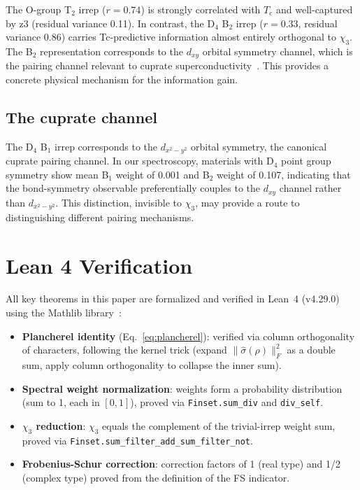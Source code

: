 \documentclass[aps,prb,twocolumn,superscriptaddress]{revtex4-2}
\newcommand{\Tc}{T_{\mathrm{c}}}
\newcommand{\frobsq}[1]{\lVert #1 \rVert_F^2}
\newcommand{\sighat}{\hat{\sigma}}
\begin{document}
The O-group T$_2$ irrep ($r = 0.74$) is strongly correlated with
$\Tc$ and well-captured by z3 (residual variance 0.11). In contrast,
the D$_4$ B$_2$ irrep ($r = 0.33$, residual variance 0.86) carries
Tc-predictive information almost entirely orthogonal to $\chi_3$. The
B$_2$ representation corresponds to the $d_{xy}$ orbital symmetry
channel, which is the pairing channel relevant to cuprate
superconductivity~\cite{sigrist1991su}. This provides a concrete
physical mechanism for the information gain.

\subsection{The cuprate channel}

The D$_4$ B$_1$ irrep corresponds to the $d_{x^2 - y^2}$ orbital
symmetry, the canonical cuprate pairing channel. In our spectroscopy,
materials with D$_4$ point group symmetry show mean B$_1$ weight of
0.001 and B$_2$ weight of 0.107, indicating that the bond-symmetry
observable preferentially couples to the $d_{xy}$ channel rather than
$d_{x^2-y^2}$. This distinction, invisible to $\chi_3$, may provide
a route to distinguishing different pairing mechanisms.

\section{Lean 4 Verification}
\label{sec:lean}

All key theorems in this paper are formalized and verified in Lean~4
(v4.29.0) using the Mathlib library~\cite{mathlib}:

\begin{itemize}
  \item \textbf{Plancherel identity} (Eq.~\ref{eq:plancherel}):
    verified via column orthogonality of characters, following the
    kernel trick (expand $\frobsq{\sighat(\rho)}$ as a double sum,
    apply column orthogonality to collapse the inner sum).
  \item \textbf{Spectral weight normalization}: weights form a
    probability distribution (sum to 1, each in $[0,1]$), proved
    via \texttt{Finset.sum\_div} and \texttt{div\_self}.
  \item \textbf{$\chi_3$ reduction}: $\chi_3$ equals the complement
    of the trivial-irrep weight sum, proved via
    \texttt{Finset.sum\_filter\_add\_sum\_filter\_not}.
  \item \textbf{Frobenius-Schur correction}: correction factors
    of 1 (real type) and 1/2 (complex type) proved from the
    definition of the FS indicator.
\end{itemize}
\end{document}
